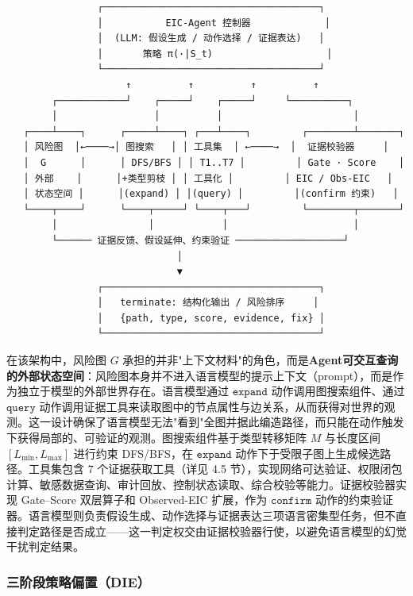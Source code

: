 \documentclass[a4paper,12pt]{ctexart}
\begin{document}
\begin{verbatim}
                ┌──────────────────────────────────────┐
                │           EIC-Agent 控制器             │
                │  (LLM: 假设生成 / 动作选择 / 证据表达)   │
                │       策略 π(·|S_t)                    │
                └──────────────────────────────────────┘
                     ↑          ↑          ↑          ↑
        ┌────────────┘    ┌─────┘    ┌─────┘     └──────────┐
        │                 │          │                       │
   ┌────┴────┐      ┌─────┴────┐ ┌───┴────┐         ┌────────┴───────┐
   │ 风险图  │←────→│ 图搜索   │ │ 工具集  │ ←────→  │  证据校验器     │
   │  G      │      │ DFS/BFS │ │ T1..T7 │         │ Gate · Score    │
   │ 外部    │      │+类型剪枝 │ │ 工具化 │         │ EIC / Obs-EIC   │
   │ 状态空间 │      │(expand) │ │(query) │         │(confirm 约束)   │
   └────┬────┘      └────┬─────┘ └────┬───┘         └────────┬───────┘
        │                │            │                      │
        └────── 证据反馈、假设延伸、约束验证 ───────────────────┘
                              │
                              ▼
                ┌──────────────────────────────────────┐
                │   terminate: 结构化输出 / 风险排序     │
                │   {path, type, score, evidence, fix} │
                └──────────────────────────────────────┘
\end{verbatim}

在该架构中，风险图 $G$ 承担的并非"上下文材料"的角色，而是\textbf{Agent可交互查询的外部状态空间}：风险图本身并不进入语言模型的提示上下文（prompt），而是作为独立于模型的外部世界存在。语言模型通过 $\texttt{expand}$ 动作调用图搜索组件、通过 $\texttt{query}$ 动作调用证据工具来读取图中的节点属性与边关系，从而获得对世界的观测。这一设计确保了语言模型无法"看到"全图并据此编造路径，而只能在动作触发下获得局部的、可验证的观测。图搜索组件基于类型转移矩阵 $M$ 与长度区间 $[L_{\min}, L_{\max}]$ 进行约束 DFS/BFS，在 $\texttt{expand}$ 动作下于受限子图上生成候选路径。工具集包含 7 个证据获取工具（详见 4.5 节），实现网络可达验证、权限闭包计算、敏感数据查询、审计回放、控制状态读取、综合校验等能力。证据校验器实现 Gate–Score 双层算子和 Observed-EIC 扩展，作为 $\texttt{confirm}$ 动作的约束验证器。语言模型则负责假设生成、动作选择与证据表达三项语言密集型任务，但不直接判定路径是否成立——这一判定权交由证据校验器行使，以避免语言模型的幻觉干扰判定结果。

\subsubsection{三阶段策略偏置（DIE）}
\end{document}
